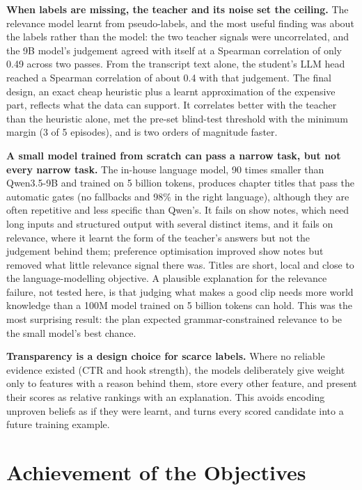 \textbf{When labels are missing, the teacher and its noise set the ceiling.} The relevance model learnt from pseudo-labels, and the most useful finding was about the labels rather than the model: the two teacher signals were uncorrelated, and the 9B model's judgement agreed with itself at a Spearman correlation of only 0.49 across two passes. From the transcript text alone, the student's LLM head reached a Spearman correlation of about 0.4 with that judgement. The final design, an exact cheap heuristic plus a learnt approximation of the expensive part, reflects what the data can support. It correlates better with the teacher than the heuristic alone, met the pre-set blind-test threshold with the minimum margin (3 of 5 episodes), and is two orders of magnitude faster.

\textbf{A small model trained from scratch can pass a narrow task, but not every narrow task.} The in-house language model, 90 times smaller than Qwen3.5-9B and trained on 5 billion tokens, produces chapter titles that pass the automatic gates (no fallbacks and 98\% in the right language), although they are often repetitive and less specific than Qwen's. It fails on show notes, which need long inputs and structured output with several distinct items, and it fails on relevance, where it learnt the form of the teacher's answers but not the judgement behind them; preference optimisation improved show notes but removed what little relevance signal there was. Titles are short, local and close to the language-modelling objective. A plausible explanation for the relevance failure, not tested here, is that judging what makes a good clip needs more world knowledge than a 100M model trained on 5 billion tokens can hold. This was the most surprising result: the plan expected grammar-constrained relevance to be the small model's best chance.

\textbf{Transparency is a design choice for scarce labels.} Where no reliable evidence existed (CTR and hook strength), the models deliberately give weight only to features with a reason behind them, store every other feature, and present their scores as relative rankings with an explanation. This avoids encoding unproven beliefs as if they were learnt, and turns every scored candidate into a future training example.

\section{Achievement of the Objectives}

